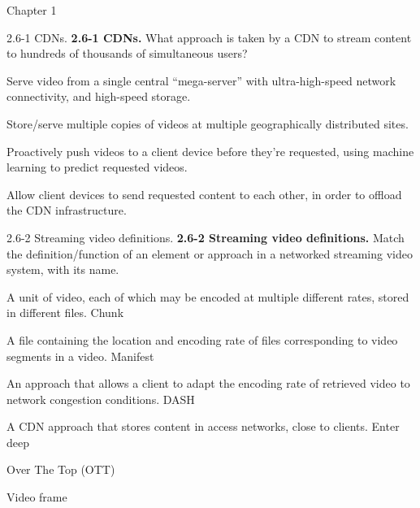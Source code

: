 \documentclass[a4paper]{article}
\begin{document}
\begin{quiz}{Chapter 1}
\begin{multi}[points=1,shuffle]{2.6-1 CDNs.}
\textbf{2.6-1 CDNs.} What approach is taken by a CDN to stream content to hundreds of thousands of simultaneous users?
\item Serve video from a single central “mega-server” with ultra-high-speed network connectivity, and high-speed storage.
\item* Store/serve multiple copies of videos at multiple geographically distributed sites.
\item Proactively push videos to a client device before they’re requested, using machine learning to predict requested videos.
\item Allow client devices to send requested content to each other, in order to offload the CDN infrastructure.
\end{multi}

\begin{matching}[points=1,shuffle]{2.6-2 Streaming video definitions.}
\textbf{2.6-2 Streaming video definitions.} Match the definition/function of an element or approach in a networked streaming video system, with its name.
\item A unit of video, each of which may be encoded at multiple different rates, stored in different files. \answer Chunk
\item A file containing the location and encoding rate of files corresponding to video segments in a video. \answer Manifest
\item An approach that allows a client to adapt the encoding rate of retrieved video to network congestion conditions. \answer DASH
\item A CDN approach that stores content in access networks, close to clients. \answer Enter deep
\item \answer Over The Top (OTT)
\item \answer Video frame
\end{matching}


\end{quiz}
\end{document}
